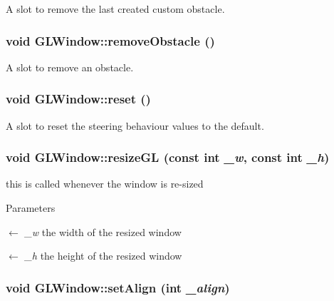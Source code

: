 A slot to remove the last created custom obstacle. \hypertarget{classGLWindow_a4052a6aa46a2d66944e4d5192e089ddf}{
\subsubsection[{removeObstacle}]{\setlength{\rightskip}{0pt plus 5cm}void GLWindow::removeObstacle ()}}
\label{classGLWindow_a4052a6aa46a2d66944e4d5192e089ddf}


A slot to remove an obstacle. \hypertarget{classGLWindow_a708df5c32f6cd62713dfb480d57d25e4}{
\subsubsection[{reset}]{\setlength{\rightskip}{0pt plus 5cm}void GLWindow::reset ()}}
\label{classGLWindow_a708df5c32f6cd62713dfb480d57d25e4}


A slot to reset the steering behaviour values to the default. \hypertarget{classGLWindow_abe57c0f40e59cba4c98759121e22eb47}{
\subsubsection[{resizeGL}]{\setlength{\rightskip}{0pt plus 5cm}void GLWindow::resizeGL (const int {\em \_\-w}, \/  const int {\em \_\-h})}}
\label{classGLWindow_abe57c0f40e59cba4c98759121e22eb47}


this is called whenever the window is re-\/sized 
\begin{DoxyParams}{Parameters}
\item[\mbox{$\leftarrow$} {\em \_\-w}]the width of the resized window \item[\mbox{$\leftarrow$} {\em \_\-h}]the height of the resized window \end{DoxyParams}
\hypertarget{classGLWindow_ad5015ebb615b203f870c293b116e842a}{
\subsubsection[{setAlign}]{\setlength{\rightskip}{0pt plus 5cm}void GLWindow::setAlign (int {\em \_\-align})}}
\label{classGLWindow_ad5015ebb615b203f870c293b116e842a}


